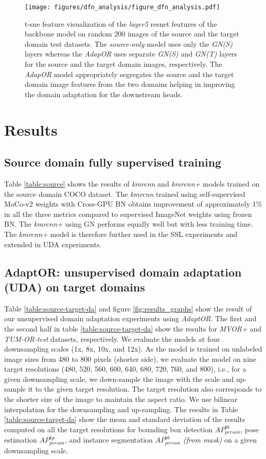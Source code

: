 \begin{figure*}[t!]
\centering
	\texttt{[image: figures/dfn\_analysis/figure\_dfn\_analysis.pdf]}
	\caption{\small{{\blue t-sne feature visualization \citep{van2008visualizing} of the \emph{layer5} resnet features of the backbone model on random 200 images of the source and the target domain test datasets. The \emph{source-only} model uses only the \emph{GN(S)} layers whereas the \emph{AdapOR} uses separate \emph{GN(S)} and \emph{GN(T)} layers for the source and the target domain images, respectively. The \emph{AdapOR} model appropriately segregates the source and the target domain image features from the two domains helping in improving the domain adaptation for the downstream heads.}}}
	\label{figure:dfn-comp}
\end{figure*}

\section{Results}
\subsection{Source domain fully supervised training}
Table \ref{table:source} shows the results of \emph{kmrcnn} and \emph{kmrcnn+} models trained on the source domain COCO dataset. The \emph{kmrcnn} trained using self-supervised MoCo-v2 weights with Cross-GPU BN \citep{peng2018megdet} obtains improvement of approximately 1\% in all the three metrics compared to supervised ImageNet weights using frozen BN. The \emph{kmrcnn+} using GN performs equally well but with less training time. The \emph{kmrcnn+} model is therefore further used in the SSL experiments and extended in UDA experiments.

\subsection{AdaptOR: unsupervised domain adaptation (UDA) on target domains}
Table \ref{table:source-target-da} and figure \ref{fig:results_graphs} show the result of our unsupervised domain adaptation experiments using \emph{AdaptOR}. The first and the second half in table \ref{table:source-target-da} show the results for \emph{MVOR+} and \emph{TUM-OR-test} datasets, respectively. We evaluate the models at four downsampling scales (1x, 8x, 10x, and 12x). As the model is trained on unlabeled image sizes from 480 to 800 pixels (shorter side), we evaluate the model on nine target resolutions (480, 520, 560, 600, 640, 680, 720, 760, and 800), i.e., for a given downsampling scale, we down-sample the image with the scale and up-sample it to the given target resolution. The target resolution also corresponds to the shorter size of the image to maintain the aspect ratio. We use bilinear interpolation for the downsampling and up-sampling. The results in Table \ref{table:source-target-da} show the mean and standard deviation of the results computed on all the target resolutions for bounding box detection \emph{$AP_{person}^{bb}$}, pose estimation \emph{$AP_{person}^{kp}$}, and instance segmentation \emph{$AP_{person}^{bb}$ (from mask)} on a given downsampling scale.

